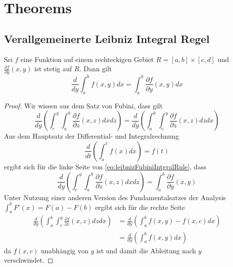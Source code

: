 \chapter{Theorems}
\section{Verallgemeinerte Leibniz Integral Regel}
\begin{theorem}
\label{thm:leibnizIntegralRule}
Sei $f$ eine Funktion auf einem rechteckigen Gebiet $R=[a,b]\times [c,d]$ und $\frac{\partial f}{\partial y}(x,y)$ ist stetig auf $R$. Dann gilt
\begin{equation}
 \frac{d}{dy}\int_a^b f(x,y)dx = \int_a^b \frac{\partial f}{\partial y}(x,y)dx
\end{equation}
\begin{proof}
 Wir wissen aus dem Satz von Fubini, dass gilt
 \begin{equation}
 \label{eq:leibnizFubiniIntgralRule}
  \frac{d}{dy}\left( \int_c^y \int_a^b \frac{\partial f}{\partial z}(x,z) dx dz\right) = 
  \frac{d}{dy}\left( \int_a^b \int_c^y \frac{\partial f}{\partial z}(x,z) dz dx\right) 
 \end{equation}
Aus dem Hauptsatz der Differential- und Integralrechnung 
\[
 \frac{d}{dt}\left( \int_a^t f(x)dx\right) = f(t)
\]
ergibt sich für die linke Seite von \eqref{eq:leibnizFubiniIntgralRule}, dass
\[
 \frac{d}{dy}\left( \int_c^y \int_a^b \frac{\partial f}{\partial z}(x,z) dx dz\right)= \int_a^b\frac{\partial f}{\partial y}(x,y)
\]
Unter Nutzung einer anderen Version des Fundamentalsatzes der Analysis $\int_a^bF'(x) =F(a) - F(b)$ ergibt sich für die rechte Seite
\[
\begin{aligned}
  \frac{d}{dy}\left( \int_a^b \int_c^y \frac{\partial f}{\partial z}(x,z) dz dx\right) &= \frac{d}{dy} \left(\int_a^b f(x,y) - f(x,c)dx\right)\\
  &= \frac{d}{dy} \left(\int_a^b f(x,y)dx\right)
\end{aligned}
 \]
da $f(x,c)$ unabhängig von $y$ ist und damit die Ableitung nach $y$ verschwindet.
\end{proof}
\end{theorem}

